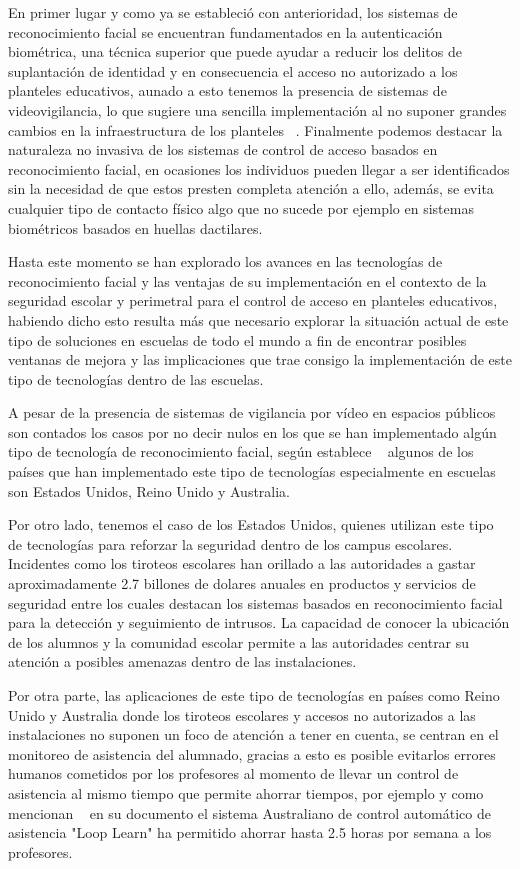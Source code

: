 En primer lugar y como ya se estableció con anterioridad, los sistemas de reconocimiento facial se encuentran fundamentados en la autenticación biométrica, una técnica superior que puede ayudar a reducir los delitos de suplantación de identidad y en consecuencia el acceso no autorizado a los planteles educativos, aunado a esto tenemos la presencia de sistemas de videovigilancia, lo que sugiere una sencilla implementación al no suponer grandes cambios en la infraestructura de los planteles ~\cite{FacialR}. Finalmente podemos destacar la naturaleza no invasiva de los sistemas de control de acceso basados en reconocimiento facial, en ocasiones los individuos pueden llegar a ser identificados sin la necesidad de que estos presten completa atención a ello, además, se evita cualquier tipo de contacto físico algo que no sucede por ejemplo en sistemas biométricos basados en huellas dactilares.


Hasta este momento se han explorado los avances en las tecnologías de reconocimiento facial y las ventajas de su implementación en el contexto de la seguridad escolar y perimetral para el control de acceso en planteles educativos, habiendo dicho esto resulta más que necesario explorar la situación actual de este tipo de soluciones en escuelas de todo el mundo a fin de encontrar posibles ventanas de mejora y las implicaciones que trae consigo la implementación de este tipo de tecnologías dentro de las escuelas.

A pesar de la presencia de sistemas de vigilancia por vídeo en espacios públicos son contados los casos por no decir nulos en los que se han implementado algún tipo de tecnología de reconocimiento facial, según establece ~\cite{FacialR} algunos de los países que han implementado este tipo de tecnologías especialmente en escuelas son Estados Unidos, Reino Unido y Australia.

Por otro lado, tenemos el caso de los Estados Unidos, quienes utilizan este tipo de tecnologías para reforzar la seguridad dentro de los campus escolares. Incidentes como los tiroteos escolares han orillado a las autoridades a gastar aproximadamente 2.7 billones de dolares anuales en productos y servicios de seguridad entre los cuales destacan los sistemas basados en reconocimiento facial para la detección y seguimiento de intrusos. La capacidad de conocer la ubicación de los alumnos y la comunidad escolar permite a las autoridades centrar su atención a posibles amenazas dentro de las instalaciones.

Por otra parte, las aplicaciones de este tipo de tecnologías en países como Reino Unido y Australia donde los tiroteos escolares y accesos no autorizados a las instalaciones no suponen un foco de atención a tener en cuenta, se centran en el monitoreo de asistencia del alumnado, gracias a esto es posible evitarlos errores humanos cometidos por los profesores al momento de llevar un control de asistencia al mismo tiempo que permite ahorrar tiempos, por ejemplo y como mencionan ~\cite{FacialR} en su documento el sistema Australiano de control automático de asistencia "Loop Learn" ha permitido ahorrar hasta 2.5 horas por semana a los profesores.

